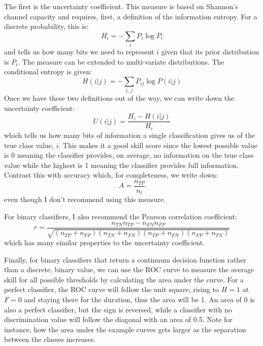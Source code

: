 \documentclass{article}
\begin{document}
The first is the uncertainty coefficient.
This measure is based on Shannon's channel capacity and requires, first, a
definition of the information entropy.
For a discrete probability, this is:
\begin{equation}
	H_i = - \sum_i P_i \log P_i
\end{equation}
and tells us how many bits we need to represent $i$ given
that its prior distribution is $P_i$.
The measure can be extended to multi-variate distributions.
The conditional entropy is given:
\begin{equation}
	H(i|j) = - \sum_{i,\,j} P_{ij} \log P(i|j)
\end{equation}
Once we have these two definitions out of the way, we can write down the
uncertainty coefficient:
\begin{equation}
	U(i|j) = \frac{H_i - H(i|j)}{H_i}
\end{equation}
which tells us how many bits of information a single classification gives us
of the true class value, $i$.
This makes it a good skill score since the lowest possible value is 0 meaning
the classifier provides, on average, no information on the true class value
while the highest is 1 meaning the classifier provides full information.
Contrast this with accuracy which, for completeness, we write down:
\begin{equation}
	A = \frac{n_{TP}}{n_t}
\end{equation}
even though I don't recommend using this measure.

For binary classifiers, I also recommend the Pearson correlation coefficient:
\begin{equation}
	r= \frac{n_{TN} n_{TP} - n_{FN} n_{FP}}
	{\sqrt{(n_{TP} + n_{FP}) (n_{TN} + n_{FN})(n_{TP} + n_{FN}) (n_{FP} + n_{TN})}}
	\label{correlation}
\end{equation}
which has many similar properties to the uncertainty coefficient.

Finally, for binary classifiers that return a continuum decision function
rather than a discrete, binary value,
we can use
the ROC curve to measure the average skill for all possible thresholds by calculating
the area under the curve.
For a perfect classifier, the ROC curve will follow the unit square, rising
to $H=1$ at $F=0$ and staying there for the duration, thus the area will
be 1.
An area of 0 is also a perfect classifier, but the sign is reversed, while
a classifier with no discrimination value will follow the diagonal 
with an area of 0.5.
Note for instance, how the area under the example curves gets larger as the separation between the classes increases.
\end{document}
